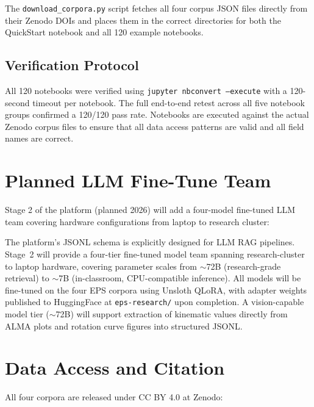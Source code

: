 \documentclass[twocolumn]{aastex631}
\begin{document}
The \texttt{download\_corpora.py} script fetches all four corpus JSON files
directly from their Zenodo DOIs and places them in the correct directories
for both the QuickStart notebook and all 120 example notebooks.

\subsection{Verification Protocol}
\label{sec:verification}

All 120 notebooks were verified using \texttt{jupyter nbconvert --execute}
with a 120-second timeout per notebook. The full end-to-end retest across
all five notebook groups confirmed a 120/120 pass rate. Notebooks are
executed against the actual Zenodo corpus files to ensure that all
data access patterns are valid and all field names are correct.

\section{Planned LLM Fine-Tune Team}
\label{sec:llms}

Stage 2 of the platform (planned 2026) will add a four-model fine-tuned
LLM team covering hardware configurations from laptop to research cluster:

The platform's JSONL schema is explicitly designed for LLM RAG pipelines.
Stage~2 will provide a four-tier fine-tuned model team spanning
research-cluster to laptop hardware, covering parameter scales from
$\sim$72B (research-grade retrieval) to $\sim$7B (in-classroom,
CPU-compatible inference). All models will be fine-tuned on the
four EPS corpora using Unsloth QLoRA, with adapter weights published
to HuggingFace at \texttt{eps-research/} upon completion.
A vision-capable model tier ($\sim$72B) will support extraction of
kinematic values directly from ALMA plots and rotation curve figures
into structured JSONL.

\section{Data Access and Citation}
\label{sec:data}

All four corpora are released under CC BY 4.0 at Zenodo:
\end{document}
